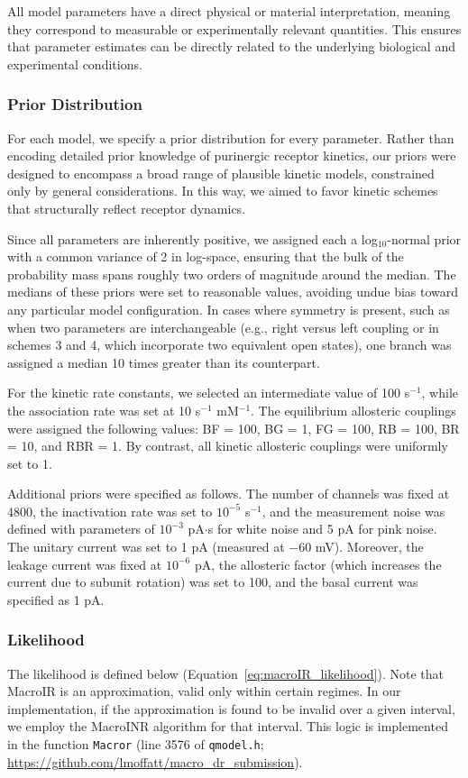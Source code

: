 \documentclass[9pt]{elife}
\begin{document}
	
	All model parameters have a direct physical or material interpretation, meaning they correspond to measurable or experimentally relevant quantities. This ensures that parameter estimates can be directly related to the underlying biological and experimental conditions.
	
	\subsubsection{Prior Distribution}
	For each model, we specify a prior distribution for every parameter. Rather than encoding detailed prior knowledge of purinergic receptor kinetics, our priors were designed to encompass a broad range of plausible kinetic models, constrained only by general considerations. In this way, we aimed to favor kinetic schemes that structurally reflect receptor dynamics.
	
	Since all parameters are inherently positive, we assigned each a log$_{10}$-normal prior with a common variance of 2 in log-space, ensuring that the bulk of the probability mass spans roughly two orders of magnitude around the median. The medians of these priors were set to reasonable values, avoiding undue bias toward any particular model configuration. In cases where symmetry is present, such as when two parameters are interchangeable (e.g., right versus left coupling or in schemes 3 and 4, which incorporate two equivalent open states), one branch was assigned a median 10 times greater than its counterpart.
	
	For the kinetic rate constants, we selected an intermediate value of 100 s$^{-1}$, while the association rate was set at 10 s$^{-1}$ mM$^{-1}$. The equilibrium allosteric couplings were assigned the following values: BF = 100, BG = 1, FG = 100, RB = 100, BR = 10, and RBR = 1. By contrast, all kinetic allosteric couplings were uniformly set to 1.
	
	Additional priors were specified as follows. The number of channels was fixed at 4800, the inactivation rate was set to $10^{-5}$ s$^{-1}$, and the measurement noise was defined with parameters of $10^{-3}$ pA$\cdot$s for white noise and 5 pA for pink noise. The unitary current was set to 1 pA (measured at $-60$ mV). Moreover, the leakage current was fixed at $10^{-6}$ pA, the allosteric factor (which increases the current due to subunit rotation) was set to 100, and the basal current was specified as 1 pA.   
	
	\subsubsection*{Likelihood}
	The likelihood is defined below (Equation~\eqref{eq:macroIR_likelihood}). Note that MacroIR is an approximation, valid only within certain regimes. In our implementation, if the approximation is found to be invalid over a given interval, we employ the MacroINR algorithm for that interval. This logic is implemented in the function \texttt{Macror} (line 3576 of \texttt{qmodel.h}; \url{https://github.com/lmoffatt/macro_dr_submission}).
	
\end{document}
